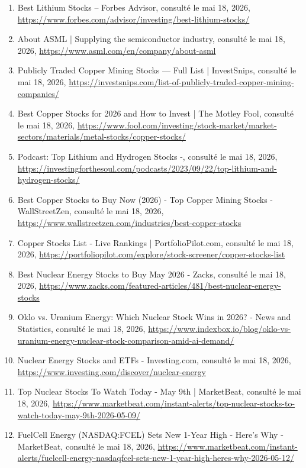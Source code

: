 \documentclass[11pt,a4paper]{article}
\begin{document}
\begin{enumerate}
    \item Best Lithium Stocks – Forbes Advisor, consulté le mai 18, 2026, \url{https://www.forbes.com/advisor/investing/best-lithium-stocks/}
    \item About ASML | Supplying the semiconductor industry, consulté le mai 18, 2026, \url{https://www.asml.com/en/company/about-asml}
    \item Publicly Traded Copper Mining Stocks — Full List | InvestSnips, consulté le mai 18, 2026, \url{https://investsnips.com/list-of-publicly-traded-copper-mining-companies/}
    \item Best Copper Stocks for 2026 and How to Invest | The Motley Fool, consulté le mai 18, 2026, \url{https://www.fool.com/investing/stock-market/market-sectors/materials/metal-stocks/copper-stocks/}
    \item Podcast: Top Lithium and Hydrogen Stocks -, consulté le mai 18, 2026, \url{https://investingforthesoul.com/podcasts/2023/09/22/top-lithium-and-hydrogen-stocks/}
    \item Best Copper Stocks to Buy Now (2026) - Top Copper Mining Stocks - WallStreetZen, consulté le mai 18, 2026, \url{https://www.wallstreetzen.com/industries/best-copper-stocks}
    \item Copper Stocks List - Live Rankings | PortfolioPilot.com, consulté le mai 18, 2026, \url{https://portfoliopilot.com/explore/stock-screener/copper-stocks-list}
    \item Best Nuclear Energy Stocks to Buy May 2026 - Zacks, consulté le mai 18, 2026, \url{https://www.zacks.com/featured-articles/481/best-nuclear-energy-stocks}
    \item Oklo vs. Uranium Energy: Which Nuclear Stock Wins in 2026? - News and Statistics, consulté le mai 18, 2026, \url{https://www.indexbox.io/blog/oklo-vs-uranium-energy-nuclear-stock-comparison-amid-ai-demand/}
    \item Nuclear Energy Stocks and ETFs - Investing.com, consulté le mai 18, 2026, \url{https://www.investing.com/discover/nuclear-energy}
    \item Top Nuclear Stocks To Watch Today - May 9th | MarketBeat, consulté le mai 18, 2026, \url{https://www.marketbeat.com/instant-alerts/top-nuclear-stocks-to-watch-today-may-9th-2026-05-09/}
    \item FuelCell Energy (NASDAQ:FCEL) Sets New 1-Year High - Here's Why - MarketBeat, consulté le mai 18, 2026, \url{https://www.marketbeat.com/instant-alerts/fuelcell-energy-nasdaqfcel-sets-new-1-year-high-heres-why-2026-05-12/}

\end{enumerate}
\end{document}
